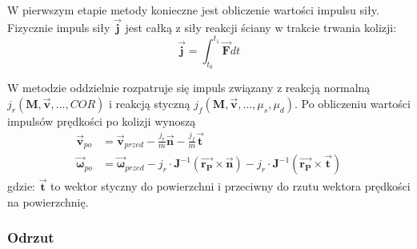 W pierwszym etapie metody konieczne jest obliczenie wartości impulsu siły. Fizycznie impuls siły $\bm{\vec{j}}$ jest całką z siły reakcji ściany w trakcie trwania kolizji:
\[
	 \bm{\vec{j}} = \int_{t_0}^{t_1} \bm{\vec{F}} dt
\]

W metodzie oddzielnie rozpatruje się impuls związany z reakcją normalną\\ $j_r \left( \bm{M}, \bm{\vec{v}}, ...  , COR \right)$ i reakcją styczną $j_f \left( \bm{M}, \bm{\vec{v}}, ...  , \mu_s, \mu_d \right)$. Po obliczeniu wartości impulsów prędkości po kolizji wynoszą 
\[
	\begin{aligned}
	\bm{\vec{v}}_{po} & = \bm{\vec{v}}_{przed} - \frac{j_r}{m} \bm{\vec{n}} - \frac{j_f}{m} \bm{\vec{t}}  \\
	\bm{\vec{\omega}}_{po} & = \bm{\vec{\omega}}_{przed} - j_r \cdot \bm{J}^{-1} \left(  \bm{\vec{r_P}} \times \bm{\vec{n}} \right) - j_r \cdot \bm{J}^{-1} \left(  \bm{\vec{r_P}} \times \bm{\vec{t}} \right)
	\end{aligned}
\]
gdzie: $\bm{\vec{t}}$ to wektor styczny do powierzchni i przeciwny do rzutu wektora prędkości na powierzchnię.

\subsubsection{Odrzut}

